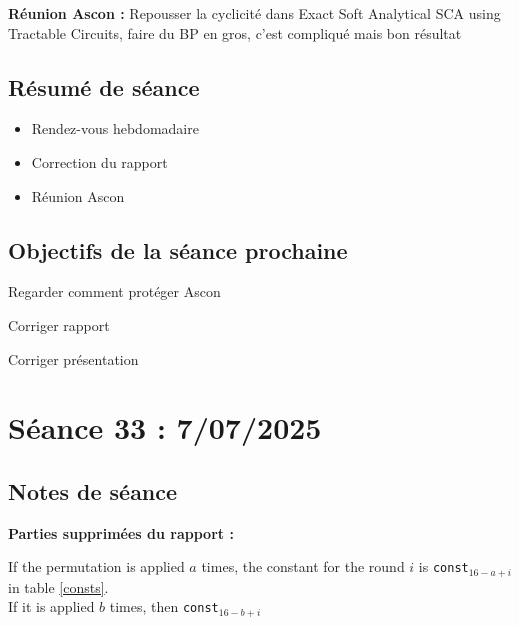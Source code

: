 \documentclass[12pt]{article}
\newcommand{\cmark}{\ding{51}}%
\newcommand{\done}{\rlap{$\square$}{\raisebox{2pt}{\large\hspace{1pt}\cmark}}%
	\hspace{-2.5pt}}
\begin{document}
	\noindent \textbf{Réunion Ascon :} Repousser la cyclicité dans Exact Soft Analytical SCA using Tractable Circuits, faire du BP en gros, c'est compliqué mais bon résultat
	
	\subsection{Résumé de séance}
	\begin{itemize}
		\item Rendez-vous hebdomadaire
		\item Correction du rapport
		\item Réunion Ascon
	\end{itemize}
	
	\subsection{Objectifs de la séance prochaine}
	\begin{todolist}
		\item Regarder comment protéger Ascon
		\item[\done] Corriger rapport
		\item[\done] Corriger présentation
	\end{todolist}
	
	
	\section{Séance 33 : 7/07/2025}
	\subsection{Notes de séance}
	\textbf{Parties supprimées du rapport :}
	
	If the permutation is applied $a$ times, the constant for the round $i$ is \verb|const|$_{16-a+i}$ in table \ref{consts}.\\
	If it is applied $b$ times, then \verb|const|$_{16-b+i}$ 
	
\end{document}
